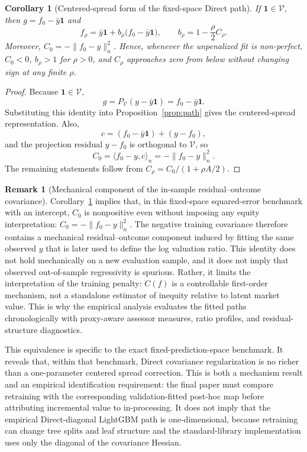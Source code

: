\documentclass[10pt]{article}
\newtheorem{corollary}{Corollary}
\theoremstyle{definition}
\newtheorem{remark}{Remark}
\newcommand{\1}{\mathbf{1}}
\newcommand{\Vcal}{\mathcal{V}}
\begin{document}
{
\begin{corollary}[Centered-spread form of the fixed-space Direct path]
\label{cor:path_scaling}
If $\1\in\Vcal$, then $g=f_0-\bar y\1$ and
\[
f_\rho
=
\bar y\1
+
b_\rho\bigl(f_0-\bar y\1\bigr),
\qquad
b_\rho
=
1-\frac{\rho}{2}C_\rho.
\]
Moreover, $C_0=-\|f_0-y\|_n^2$. Hence, whenever the unpenalized fit is non-perfect, $C_0<0$, $b_\rho>1$ for $\rho>0$, and $C_\rho$ approaches zero from below without changing sign at any finite $\rho$.
\end{corollary}

\begin{proof}
Because $\1\in\Vcal$,
\[
g=P_{\Vcal}(y-\bar y\1)=f_0-\bar y\1.
\]
Substituting this identity into Proposition~\ref{prop:path} gives the centered-spread representation. Also,
\[
c=(f_0-\bar y\1)+(y-f_0),
\]
and the projection residual $y-f_0$ is orthogonal to $\Vcal$, so
\[
C_0
=
\langle f_0-y,c\rangle_n
=
-\|f_0-y\|_n^2.
\]
The remaining statements follow from $C_\rho=C_0/(1+\rho A/2)$.
\end{proof}

\begin{remark}[Mechanical component of the in-sample residual--outcome covariance]
\label{rem:mechanical_covariance}
Corollary~\ref{cor:path_scaling} implies that, in this fixed-space squared-error benchmark with an intercept, $C_0$ is nonpositive even without imposing any equity interpretation: $C_0=-\|f_0-y\|_n^2$. The negative training covariance therefore contains a mechanical residual--outcome component induced by fitting the same observed $y$ that is later used to define the log valuation ratio. This identity does not hold mechanically on a new evaluation sample, and it does not imply that observed out-of-sample regressivity is spurious. Rather, it limits the interpretation of the training penalty: $C(f)$ is a controllable first-order mechanism, not a standalone estimator of inequity relative to latent market value. This is why the empirical analysis evaluates the fitted paths chronologically with proxy-aware assessor measures, ratio profiles, and residual-structure diagnostics.
\end{remark}


This equivalence is specific to the exact fixed-prediction-space benchmark. It reveals that, within that benchmark, Direct covariance regularization is no richer than a one-parameter centered spread correction. This is both a mechanism result and an empirical identification requirement: the final paper must compare retraining with the corresponding validation-fitted post-hoc map before attributing incremental value to in-processing. It does not imply that the empirical Direct-diagonal LightGBM path is one-dimensional, because retraining can change tree splits and leaf structure and the standard-library implementation uses only the diagonal of the covariance Hessian.
}
\end{document}
